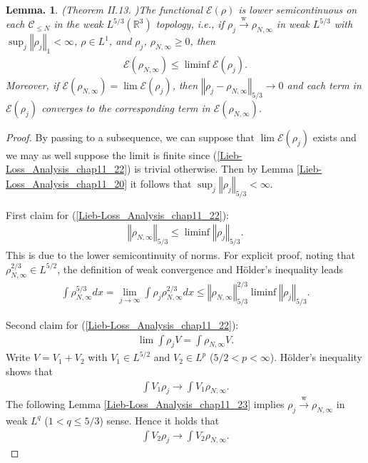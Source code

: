 \documentclass[openany, a4paper, oneside]{book}
\theoremstyle{break}
\newtheorem{lem}[thm]{Lemma.}
\theoremstyle{breakdefn}
\newcommand{\norm}[1]{\left\Vert#1\right\Vert}
\newcommand{\bbRthree}{\mathbb{R}^3}
\newcommand{\calC}{\mathcal{C}}
\newcommand{\calE}{\mathcal{E}}
\newcommand{\limjtoinfty}{\lim_{j \to \infty}}
\newcommand{\rhoNinfty}{\rho_{N, \infty}}
\newcommand{\wto}{\xrightarrow{\text{w}}}
\begin{document}
\begin{lem}\textup{(Theorem II.13. \cite{LiebSimon1})}\label{Lieb-Loss_Analysis_chap11_24}
 The functional $\calE (\rho)$ is lower semicontinuous on each $\calC_{\leq N}$ in the weak $L^{5/3} (\bbRthree)$ topology, i.e.,
 if $\rho_j \wto \rhoNinfty$ in weak $L^{5/3}$ with $\sup_j \norm{\rho_j}_1 < \infty$, $\rho \in L^1$, and $\rho_j$, $\rhoNinfty \geq 0$,
 then
 \begin{align}
  \calE (\rhoNinfty)
  \leq
  \liminf \calE (\rho_j). \label{Lieb-Loss_Analysis_chap11_22}
 \end{align}
 Moreover, if $\calE (\rhoNinfty) = \lim \calE (\rho_j)$, then $\norm{\rho_j - \rhoNinfty}_{5/3} \to 0$ and
 each term in $\calE (\rho_j)$ converges to the corresponding term in $\calE (\rhoNinfty)$.
\end{lem}
\begin{proof}
By passing to a subsequence, we can suppose that $\lim \calE (\rho_j)$ exists and we may as well suppose the limit is finite
since (\ref{Lieb-Loss_Analysis_chap11_22}) is trivial otherwise.
Then by Lemma \ref{Lieb-Loss_Analysis_chap11_20} it follows that $\sup_j \norm{\rho_j}_{5/3} < \infty$.

First claim for (\ref{Lieb-Loss_Analysis_chap11_22}):
\begin{align}
 \norm{\rhoNinfty}_{5/3}
 \leq
 \liminf \norm{\rho_j}_{5/3}.
\end{align}
This is due to the lower semicontinuity of norms.
For explicit proof, noting that $\rhoNinfty^{2/3} \in L^{5/2}$, the definition of weak convergence and H\"older's inequality leads
\begin{align}
 \int \rhoNinfty^{5/3} dx
 =
 \limjtoinfty \int \rho_j \rhoNinfty^{2/3} dx
 \leq
 \norm{\rhoNinfty}_{5/3}^{2/3} \liminf \norm{\rho_j}_{5/3}.
\end{align}

Second claim for (\ref{Lieb-Loss_Analysis_chap11_22}):
\begin{align}
 \lim \int \rho_j V
 =
 \int \rhoNinfty V.
\end{align}
Write $V = V_1 + V_2$ with $V_1 \in L^{5/2}$ and $V_2 \in L^p$ ($5/2 < p < \infty$).
H\"older's inequality shows that
\begin{align}
 \int V_1 \rho_j \to \int V_1 \rhoNinfty.
\end{align}
The following Lemma \ref{Lieb-Loss_Analysis_chap11_23} implies $\rho_j \wto \rhoNinfty$ in weak $L^q$ ($1 < q \leq 5/3$) sense.
Hence it holds that
\begin{align}
 \int V_2 \rho_j \to \int V_2 \rhoNinfty.
\end{align}


\end{proof}
\end{document}

